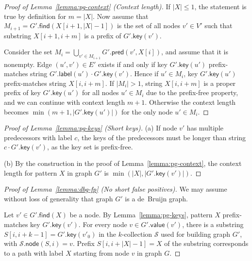 \documentclass[a4paper,UKenglish]{lipics-v2016}
\newcommand{\abs}[1]{\ensuremath{\lvert #1 \rvert}}
\newcommand{\find}{\ensuremath{\mathsf{find}}}
\newcommand{\glabel}{\ensuremath{\mathsf{label}}}
\newcommand{\gpred}{\ensuremath{\mathsf{pred}}}
\newcommand{\gkey}{\ensuremath{\mathsf{key}}}
\newcommand{\gvalue}{\ensuremath{\mathsf{value}}}
\newcommand{\gnode}{\ensuremath{\mathsf{node}}}
\newcommand{\kcollection}[1]{$#1$\nobreakdash-collection}
\begin{document}
\begin{proof}[Proof of Lemma~\ref{lemma:pg-context} (Context length)]
If $\abs{X} \le 1$, the statement is true by definition for $m = \abs{X}$. Now assume that $M_{i+1} = G'.\find(X[i+1, \abs{X}-1])$ is the set of all nodes $v' \in V'$ such that substring $X[i+1, i+m]$ is a prefix of $G'.\gkey(v')$.

Consider the set $M_{i} = \bigcup_{v' \in M_{i+1}} G'.\gpred(v', X[i])$, and assume that it is nonempty. Edge $(u', v') \in E'$ exists if and only if key $G'.\gkey(u')$ prefix-matches string $G'.\glabel(u') \cdot G'.\gkey(v')$. Hence if $u' \in M_{i}$, key $G'.\gkey(u')$ prefix-matches string $X[i, i+m]$. If $\abs{M_{i}} > 1$, string $X[i, i+m]$ is a proper prefix of key $G'.\gkey(u')$ for all nodes $u' \in M_{i}$ due to the prefix-free property, and we can continue with context length $m+1$. Otherwise the context length becomes $\min(m+1, \abs{G'.\gkey(u')})$ for the only node $u' \in M_{i}$.
\end{proof}

\begin{proof}[Proof of Lemma~\ref{lemma:pg-keys} (Short keys)]
(a) If node $v'$ has multiple predecessors with label $c$, the keys of the predecessors must be longer than string $c \cdot G'.\gkey(v')$, as the key set is prefix-free.

(b) By the construction in the proof of Lemma~\ref{lemma:pg-context}, the context length for pattern $X$ in graph $G'$ is $\min(\abs{X}, \abs{G'.\gkey(v')})$.
\end{proof}

\begin{proof}[Proof of Lemma~\ref{lemma:dbg-fp} (No short false positives)]
We may assume without loss of generality that graph $G'$ is a de~Bruijn graph.

Let $v' \in G'.\find(X)$ be a node. By Lemma~\ref{lemma:pg-keys}, pattern $X$ prefix-matches key $G'.\gkey(v')$. For every node $v \in G'.\gvalue(v')$, there is a substring $S[i, i+k-1] = G'.\gkey(v'_{0})$ in the \kcollection{k} $\mathcal{S}$ used for building graph $G'$, with $\mathcal{S}.\gnode(S, i) = v$. Prefix $S[i, i+\abs{X}-1] = X$ of the substring corresponds to a path with label $X$ starting from node $v$ in graph $G$.
\end{proof}
\end{document}
